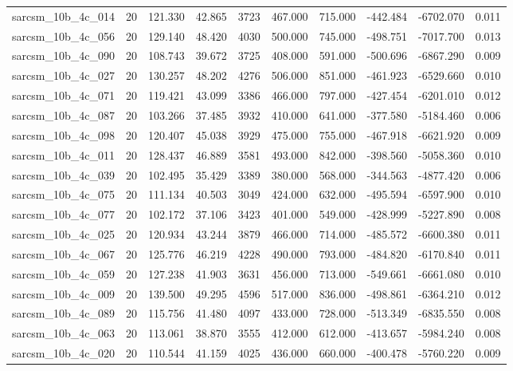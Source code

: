 \begin{tabular}{lrrrrrrrrr}
sarcsm\_10b\_4c\_014 & 20 & 121.330 & 42.865 & 3723 & 467.000 & 715.000 & -442.484 & -6702.070 & 0.011 \\
sarcsm\_10b\_4c\_056 & 20 & 129.140 & 48.420 & 4030 & 500.000 & 745.000 & -498.751 & -7017.700 & 0.013 \\
sarcsm\_10b\_4c\_090 & 20 & 108.743 & 39.672 & 3725 & 408.000 & 591.000 & -500.696 & -6867.290 & 0.009 \\
sarcsm\_10b\_4c\_027 & 20 & 130.257 & 48.202 & 4276 & 506.000 & 851.000 & -461.923 & -6529.660 & 0.010 \\
sarcsm\_10b\_4c\_071 & 20 & 119.421 & 43.099 & 3386 & 466.000 & 797.000 & -427.454 & -6201.010 & 0.012 \\
sarcsm\_10b\_4c\_087 & 20 & 103.266 & 37.485 & 3932 & 410.000 & 641.000 & -377.580 & -5184.460 & 0.006 \\
sarcsm\_10b\_4c\_098 & 20 & 120.407 & 45.038 & 3929 & 475.000 & 755.000 & -467.918 & -6621.920 & 0.009 \\
sarcsm\_10b\_4c\_011 & 20 & 128.437 & 46.889 & 3581 & 493.000 & 842.000 & -398.560 & -5058.360 & 0.010 \\
sarcsm\_10b\_4c\_039 & 20 & 102.495 & 35.429 & 3389 & 380.000 & 568.000 & -344.563 & -4877.420 & 0.006 \\
sarcsm\_10b\_4c\_075 & 20 & 111.134 & 40.503 & 3049 & 424.000 & 632.000 & -495.594 & -6597.900 & 0.010 \\
sarcsm\_10b\_4c\_077 & 20 & 102.172 & 37.106 & 3423 & 401.000 & 549.000 & -428.999 & -5227.890 & 0.008 \\
sarcsm\_10b\_4c\_025 & 20 & 120.934 & 43.244 & 3879 & 466.000 & 714.000 & -485.572 & -6600.380 & 0.011 \\
sarcsm\_10b\_4c\_067 & 20 & 125.776 & 46.219 & 4228 & 490.000 & 793.000 & -484.820 & -6170.840 & 0.011 \\
sarcsm\_10b\_4c\_059 & 20 & 127.238 & 41.903 & 3631 & 456.000 & 713.000 & -549.661 & -6661.080 & 0.010 \\
sarcsm\_10b\_4c\_009 & 20 & 139.500 & 49.295 & 4596 & 517.000 & 836.000 & -498.861 & -6364.210 & 0.012 \\
sarcsm\_10b\_4c\_089 & 20 & 115.756 & 41.480 & 4097 & 433.000 & 728.000 & -513.349 & -6835.550 & 0.008 \\
sarcsm\_10b\_4c\_063 & 20 & 113.061 & 38.870 & 3555 & 412.000 & 612.000 & -413.657 & -5984.240 & 0.008 \\
sarcsm\_10b\_4c\_020 & 20 & 110.544 & 41.159 & 4025 & 436.000 & 660.000 & -400.478 & -5760.220 & 0.009 \\

\end{tabular}
